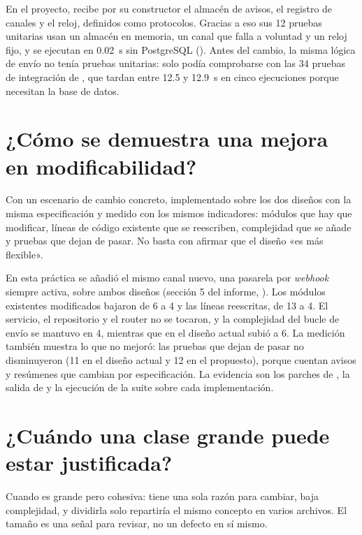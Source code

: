 \documentclass[11pt,a4paper]{article}
\begin{document}
En el proyecto,  recibe por su constructor el almacén de avisos, el registro de canales y el reloj, definidos como protocolos. Gracias a eso sus 12 pruebas unitarias usan un almacén en memoria, un canal que falla a voluntad y un reloj fijo, y se ejecutan en 0.02~s sin PostgreSQL (). Antes del cambio, la misma lógica de envío no tenía pruebas unitarias: solo podía comprobarse con las 34 pruebas de integración de , que tardan entre 12.5 y 12.9~s en cinco ejecuciones porque necesitan la base de datos.

\section{¿Cómo se demuestra una mejora en modificabilidad?}

Con un escenario de cambio concreto, implementado sobre los dos diseños con la misma especificación y medido con los mismos indicadores: módulos que hay que modificar, líneas de código existente que se reescriben, complejidad que se añade y pruebas que dejan de pasar. No basta con afirmar que el diseño «es más flexible».

En esta práctica se añadió el mismo canal nuevo, una pasarela por \emph{webhook} siempre activa, sobre ambos diseños (sección 5 del informe, ). Los módulos existentes modificados bajaron de 6 a 4 y las líneas reescritas, de 13 a 4. El servicio, el repositorio y el router no se tocaron, y la complejidad del bucle de envío se mantuvo en 4, mientras que en el diseño actual subió a 6. La medición también muestra lo que no mejoró: las pruebas que dejan de pasar no disminuyeron (11 en el diseño actual y 12 en el propuesto), porque cuentan avisos y resúmenes que cambian por especificación. La evidencia son los parches de , la salida de \mbox{} y la ejecución de la suite sobre cada implementación.

\section{¿Cuándo una clase grande puede estar justificada?}

Cuando es grande pero cohesiva: tiene una sola razón para cambiar, baja complejidad, y dividirla solo repartiría el mismo concepto en varios archivos. El tamaño es una señal para revisar, no un defecto en sí mismo.
\end{document}
